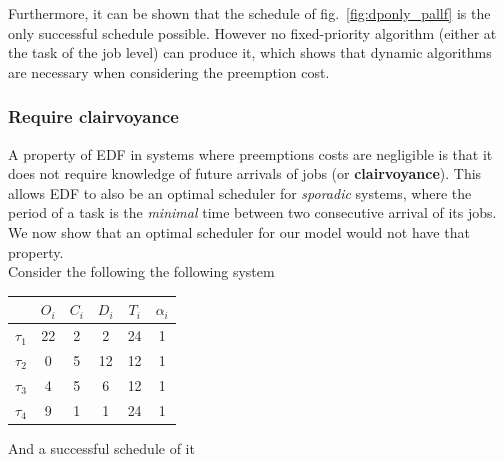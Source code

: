 \documentclass[a4paper,10pt]{article}
\begin{document}
        Furthermore, it can be shown that the schedule of fig.~\ref{fig:dponly_pallf} is the only successful schedule possible. However no fixed-priority algorithm (either at the task of the job level) can produce it, which shows that dynamic algorithms are necessary when considering the preemption cost.


        \subsubsection{Require clairvoyance}

        A property of EDF in systems where preemptions costs are negligible is that it does not require knowledge of future arrivals of jobs (or \textbf{clairvoyance}). This allows EDF to also be an optimal scheduler for \emph{sporadic} systems, where the period of a task is the \emph{minimal} time between two consecutive arrival of its jobs. We now show that an optimal scheduler for our model would not have that property.\\

        Consider the following the following system

        \begin{center}
            \begin{tabular}{|r|c|c|c|c|c|}
                \hline
                            & $O_i$ & $C_i$ & $D_i$ & $T_i$ & $\alpha_i$ \\ \hline
                $\tau_1$    & 22    & 2     & 2    & 24    & 1     \\ \hline
                $\tau_2$    & 0     & 5     & 12   & 12    & 1     \\ \hline
                $\tau_3$    & 4     & 5     & 6    & 12    & 1     \\ \hline
                $\tau_4$    & 9     & 1     & 1    & 24    & 1     \\ \hline
            \end{tabular}
        \end{center}

        And a successful schedule of it
\end{document}
